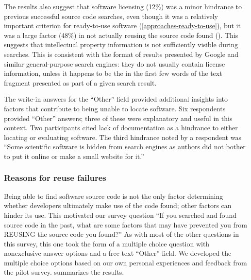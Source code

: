 \documentclass{casicswhitepaper}
\begin{document}
The results also suggest that software licensing (12\%) was a minor hindrance to previous successful source code searches, even though it was a relatively important criterion for ready-to-use software (\ref{approaches-ready-to-use}), but it was a large factor (48\%) in not actually reusing the source code found (). This suggests that intellectual property information is not sufficiently visible during searches.  This is consistent with the format of results presented by Google and similar general-purpose search engines: they do not usually contain license information, unless it happens to be the in the first few words of the text fragment presented as part of a given search result.


%

The write-in answers for the ``Other'' field provided additional insights into factors that contribute to being unable to locate software.  Six respondents provided ``Other'' answers; three of these were explanatory and useful in this context.  Two participants cited lack of documentation as a hindrance to either locating or evaluating software.  The third hindrance noted by a respondent was ``Some scientific software is hidden from search engines as authors did not bother to put it online or make a small website for it.''


\subsubsection{Reasons for reuse failures}
\label{reuse-failures}

Being able to find software source code is not the only factor determining whether developers ultimately make use of the code found; other factors can hinder its use.  This motivated our survey question ``If you searched and found source code in the past, what are some factors that may have prevented you from REUSING the source code you found?''  As with most of the other questions in this survey, this one took the form of a multiple choice question with nonexclusive answer options and a free-text ``Other'' field.  We developed the multiple choice options based on our own personal experiences and feedback from the pilot survey.   summarizes the results.
\end{document}

